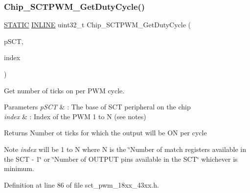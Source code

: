 \subsubsection{\texorpdfstring{Chip\+\_\+\+S\+C\+T\+P\+W\+M\+\_\+\+Get\+Duty\+Cycle()}{Chip\_SCTPWM\_GetDutyCycle()}}
{\footnotesize\ttfamily \hyperlink{group___l_p_c___types___public___macros_ga10b2d890d871e1489bb02b7e70d9bdfb}{S\+T\+A\+T\+IC} \hyperlink{spifi__18xx__43xx_8h_a2eb6f9e0395b47b8d5e3eeae4fe0c116}{I\+N\+L\+I\+NE} uint32\+\_\+t Chip\+\_\+\+S\+C\+T\+P\+W\+M\+\_\+\+Get\+Duty\+Cycle (\begin{DoxyParamCaption}\item[{\hyperlink{struct_l_p_c___s_c_t___t}{L\+P\+C\+\_\+\+S\+C\+T\+\_\+T} $\ast$}]{p\+S\+CT,  }\item[{uint8\+\_\+t}]{index }\end{DoxyParamCaption})}



Get number of ticks on per P\+WM cycle. 


\begin{DoxyParams}{Parameters}
{\em p\+S\+CT} & \+: The base of S\+CT peripheral on the chip \\
\hline
{\em index} & \+: Index of the P\+WM 1 to N (see notes) \\
\hline
\end{DoxyParams}
\begin{DoxyReturn}{Returns}
Number ot ticks for which the output will be ON per cycle 
\end{DoxyReturn}
\begin{DoxyNote}{Note}
{\itshape index} will be 1 to N where N is the \char`\"{}\+Number of
         match registers available in the S\+C\+T -\/ 1\char`\"{} or \char`\"{}\+Number of O\+U\+T\+P\+U\+T pins available in the S\+C\+T\char`\"{} whichever is minimum. 
\end{DoxyNote}


Definition at line 86 of file sct\+\_\+pwm\+\_\+18xx\+\_\+43xx.\+h.

\mbox{\label{group___s_c_t___p_w_m__18_x_x__43_x_x_ga6a111f1642326388361bcc2a251a502b}} 
